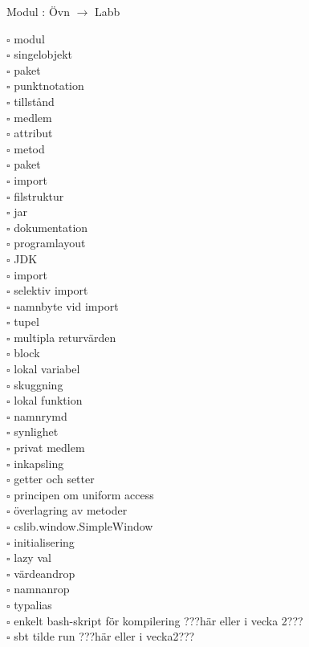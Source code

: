 
    Modul : Övn  $\rightarrow$ Labb 
    \begin{multicols}{3}\SlideFontTiny
    $\square$ modul \\
$\square$ singelobjekt \\
$\square$ paket \\
$\square$ punktnotation \\
$\square$ tillstånd \\
$\square$ medlem \\
$\square$ attribut \\
$\square$ metod \\
$\square$ paket \\
$\square$ import \\
$\square$ filstruktur \\
$\square$ jar \\
$\square$ dokumentation \\
$\square$ programlayout \\
$\square$ JDK \\
$\square$ import \\
$\square$ selektiv import \\
$\square$ namnbyte vid import \\
$\square$ tupel \\
$\square$ multipla returvärden \\
$\square$ block \\
$\square$ lokal variabel \\
$\square$ skuggning \\
$\square$ lokal funktion \\
$\square$ namnrymd \\
$\square$ synlighet \\
$\square$ privat medlem \\
$\square$ inkapsling \\
$\square$ getter och setter \\
$\square$ principen om uniform access \\
$\square$ överlagring av metoder \\
$\square$ cslib.window.SimpleWindow \\
$\square$ initialisering \\
$\square$ lazy val \\
$\square$ värdeandrop \\
$\square$ namnanrop \\
$\square$ typalias \\
$\square$ enkelt bash-skript för kompilering ???här eller i vecka 2??? \\
$\square$ sbt tilde run ???här eller i vecka2??? \\
    \end{multicols}
    